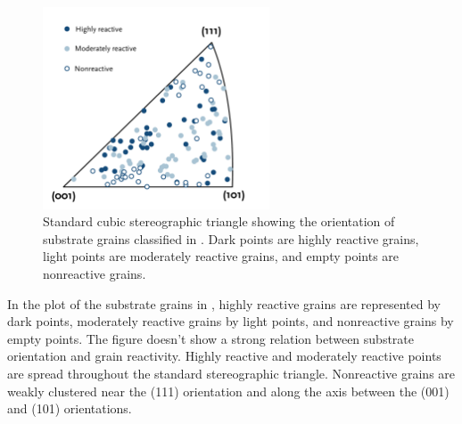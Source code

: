 \begin{figure}
	\begin{center}
	\includegraphics[width=0.6\textwidth]{substrateplot.pdf}
	\caption[Orientation of substrate grains]{%
	Standard cubic stereographic triangle showing the orientation of
	substrate grains classified in . Dark points are
	highly reactive grains, light points are moderately reactive grains,
	and empty points are nonreactive grains.}
	\label{fig:substrateplot}
	\end{center}
\end{figure}
In the plot of the substrate grains in , highly reactive grains
are represented by dark points, moderately reactive grains by light points, and
nonreactive grains by empty points. The figure doesn't show a strong relation between
substrate orientation and grain reactivity. Highly reactive and moderately reactive points
are spread throughout the standard stereographic triangle. Nonreactive grains are weakly
clustered near the (111) orientation and along the axis between the (001) and (101)
orientations.


